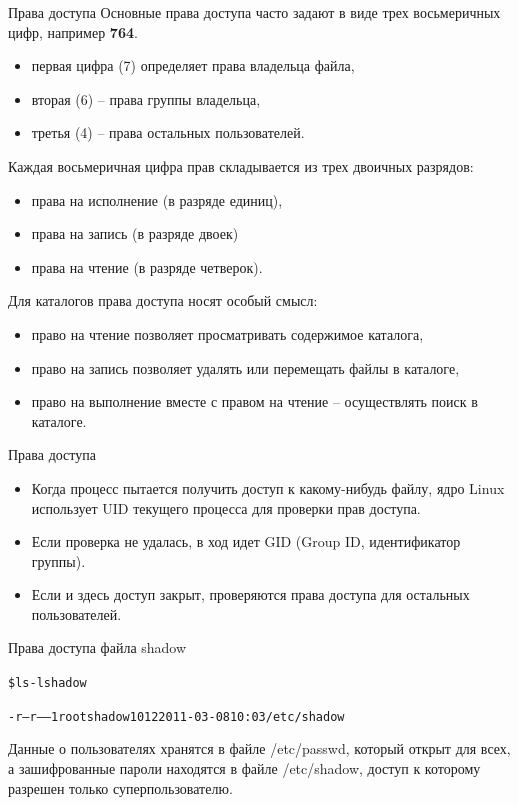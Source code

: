 \documentclass[xcolor=table]{beamer}
\begin{document}
\begin{frame}[fragile]{Права доступа}
	Основные права доступа часто задают в виде трех восьмеричных цифр, например \textbf{764}. 
	\begin{itemize}
		\item первая цифра (7) определяет права владельца файла, 
		\item вторая (6) – права группы владельца, 
		\item третья (4) – права остальных пользователей.
	\end{itemize}
	Каждая восьмеричная цифра прав складывается из трех двоичных разрядов:
	\begin{itemize}
		\item права на исполнение (в разряде единиц), 
		\item права на запись (в разряде двоек) 
		\item права на чтение (в разряде четверок).	
	\end{itemize}
	
	Для каталогов права доступа носят особый смысл:
	\begin{itemize}
		\item право на чтение позволяет просматривать содержимое каталога, 
		\item право на запись позволяет удалять или перемещать файлы в каталоге, 
		\item право на выполнение вместе с правом на чтение – осуществлять поиск в каталоге.
	\end{itemize}	
\end{frame}

\begin{frame}[fragile]{Права доступа}
	\begin{itemize}
		\item Когда процесс пытается получить доступ к какому-нибудь файлу, ядро Linux использует UID текущего процесса для проверки прав доступа.
		\item Если проверка не удалась, в ход идет GID (Group ID, идентификатор группы). 
		\item Если и здесь доступ закрыт, проверяются права доступа для остальных пользователей.
	\end{itemize}
	\begin{block}{Права доступа файла shadow}
		\begin{alltt}
		\$ ls -l shadow

		-r--r----- 1 root shadow 1012 2011-03-08 10:03 /etc/shadow
		\end{alltt}
	\end{block}
	Данные о пользователях хранятся в файле /etc/passwd, который открыт для всех, а зашифрованные пароли находятся в файле /etc/shadow, доступ к которому разрешен только суперпользователю.
\end{frame}
\end{document}
